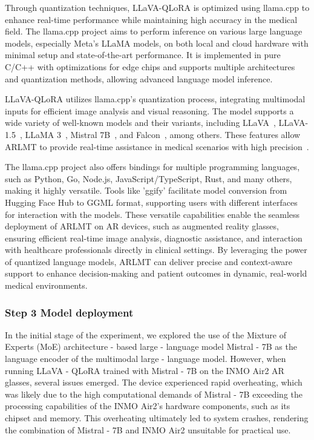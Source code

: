\documentclass[10pt,letterpaper]{article}
\begin{document}

Through quantization techniques, LLaVA-QLoRA is optimized using llama.cpp to enhance real-time performance while maintaining high accuracy in the medical field. The llama.cpp project aims to perform inference on various large language models, especially Meta's LLaMA models, on both local and cloud hardware with minimal setup and state-of-the-art performance. It is implemented in pure C/C++ with optimizations for edge chips and supports multiple architectures and quantization methods, allowing advanced language model inference.

LLaVA-QLoRA utilizes llama.cpp's quantization process, integrating multimodal inputs for efficient image analysis and visual reasoning. The model supports a wide variety of well-known models and their variants, including LLaVA~\cite{liu2023llava}, LLaVA-1.5~\cite{liu2023improvedllava}, LLaMA 3~\cite{llama3ref}, Mistral 7B~\cite{mistral7bref}, and Falcon~\cite{falconref}, among others. These features allow ARLMT to provide real-time assistance in medical scenarios with high precision~\cite{ggerganov2023llamacpp}.

The llama.cpp project also offers bindings for multiple programming languages, such as Python, Go, Node.js, JavaScript/TypeScript, Rust, and many others, making it highly versatile. Tools like 'ggify' facilitate model conversion from Hugging Face Hub to GGML format, supporting users with different interfaces for interaction with the models. These versatile capabilities enable the seamless deployment of ARLMT on AR devices, such as augmented reality glasses, ensuring efficient real-time image analysis, diagnostic assistance, and interaction with healthcare professionals directly in clinical settings. By leveraging the power of quantized language models, ARLMT can deliver precise and context-aware support to enhance decision-making and patient outcomes in dynamic, real-world medical environments.

\subsubsection*{Step 3 Model deployment}

In the initial stage of the experiment, we explored the use of the Mixture of Experts (MoE) architecture - based large - language model Mistral - 7B as the language encoder of the multimodal large - language model. However, when running LLaVA - QLoRA trained with Mistral - 7B on the INMO Air2 AR glasses, several issues emerged. The device experienced rapid overheating, which was likely due to the high computational demands of Mistral - 7B exceeding the processing capabilities of the INMO Air2's hardware components, such as its chipset and memory. This overheating ultimately led to system crashes, rendering the combination of Mistral - 7B and INMO Air2 unsuitable for practical use.
\end{document}
